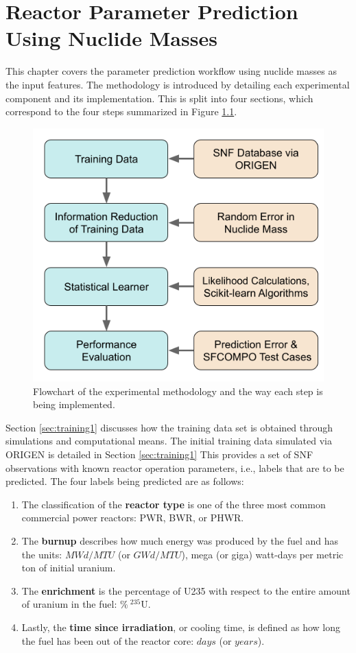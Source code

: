 
\glsresetall

\chapter{Reactor Parameter Prediction Using Nuclide Masses}
\label{ch:exp1}

This chapter covers the parameter prediction workflow using nuclide masses as
the input features. The methodology is introduced by detailing each
experimental component and its implementation. This is split into four
sections, which correspond to the four steps summarized in Figure
\ref{fig:method1}.

\begin{figure}[!ht]
  \centering
  \includegraphics[width=0.7\linewidth]{./chapters/exp1/methodology1.png}
  \caption[Experimental methodology in Chapter \ref{ch:exp1}]
          {Flowchart of the experimental methodology and the way each step is 
           being implemented.}
  \label{fig:method1}
\end{figure}

Section \ref{sec:training1} discusses how the training data set is obtained
through simulations and computational means. The initial training data
simulated via \gls{ORIGEN} is detailed in Section \ref{sec:training1} This
provides a set of \gls{SNF} observations with known reactor operation
parameters, i.e., labels that are to be predicted. The four labels being
predicted are as follows:
\begin{enumerate}
  \item The classification of the \textbf{reactor type} is one of the three
        most common commercial power reactors: \gls{PWR}, \gls{BWR}, or 
        \gls{PHWR}.
  \item The \textbf{burnup} describes how much energy was produced by the fuel
        and has the units: $MWd/MTU$ (or $GWd/MTU$), mega (or giga) 
        watt-days per metric ton of initial uranium.
  \item The \textbf{enrichment} is the percentage of \gls{U235} with respect to
        the entire amount of uranium in the fuel: $\%\:{}^{235}\text{U}$. 
  \item Lastly, the \textbf{time since irradiation}, or cooling time, is
        defined as how long the fuel has been out of the reactor core: $days$ 
        (or $years$).
\end{enumerate}

